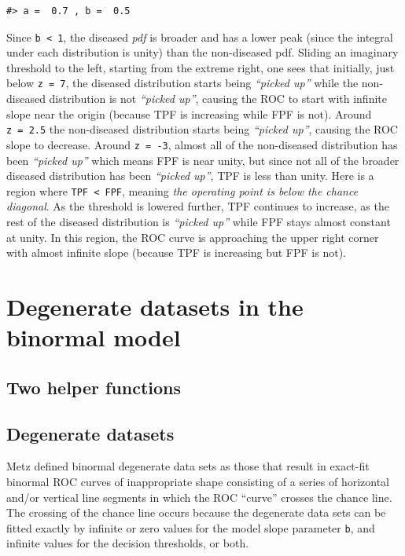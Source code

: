\documentclass[
]{book}
\begin{document}
\begin{verbatim}
#> a =  0.7 , b =  0.5
\end{verbatim}

Since \texttt{b\ \textless{}\ 1}, the diseased \emph{pdf} is broader and has a lower peak (since the integral under each distribution is unity) than the non-diseased pdf. Sliding an imaginary threshold to the left, starting from the extreme right, one sees that initially, just below \texttt{z\ =\ 7}, the diseased distribution starts being \emph{``picked up''} while the non-diseased distribution is not \emph{``picked up''}, causing the ROC to start with infinite slope near the origin (because TPF is increasing while FPF is not). Around \texttt{z\ =\ 2.5} the non-diseased distribution starts being \emph{``picked up''}, causing the ROC slope to decrease. Around \texttt{z\ =\ -3}, almost all of the non-diseased distribution has been \emph{``picked up''} which means FPF is near unity, but since not all of the broader diseased distribution has been \emph{``picked up''}, TPF is less than unity. Here is a region where \texttt{TPF\ \textless{}\ FPF}, meaning \emph{the operating point is below the chance diagonal}. As the threshold is lowered further, TPF continues to increase, as the rest of the diseased distribution is \emph{``picked up''} while FPF stays almost constant at unity. In this region, the ROC curve is approaching the upper right corner with almost infinite slope (because TPF is increasing but FPF is not).

\hypertarget{DegenerateDatasetsBinormalModel}{%
\chapter{Degenerate datasets in the binormal model}\label{DegenerateDatasetsBinormalModel}}

\hypertarget{two-helper-functions}{%
\section{Two helper functions}\label{two-helper-functions}}

\hypertarget{degenerate-datasets}{%
\section{Degenerate datasets}\label{degenerate-datasets}}

Metz defined binormal degenerate data sets as those that result in exact-fit binormal ROC curves of inappropriate shape consisting of a series of horizontal and/or vertical line segments in which the ROC ``curve'' crosses the chance line. The crossing of the chance line occurs because the degenerate data sets can be fitted exactly by infinite or zero values for the model slope parameter \texttt{b}, and infinite values for the decision thresholds, or both.
\end{document}
